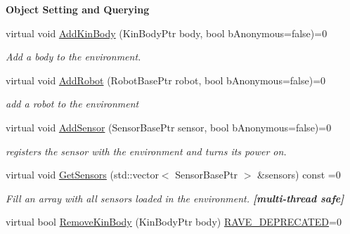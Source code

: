 \begin{Indent}{\bf Object Setting and Querying}\par
{\em \label{_amgrpaf76c21bb2575e8baa8ec7b09e379de9}
 \label{classOpenRAVE_1_1EnvironmentBase_env_objects}
\hypertarget{classOpenRAVE_1_1EnvironmentBase_env_objects}{}
 }\begin{DoxyCompactItemize}
\item 
virtual void \hyperlink{classOpenRAVE_1_1EnvironmentBase_a979950f27af5a2ce3d8b622cd98b33f5}{AddKinBody} (KinBodyPtr body, bool bAnonymous=false)=0
\begin{DoxyCompactList}\small\item\em Add a body to the environment. \item\end{DoxyCompactList}\item 
virtual void \hyperlink{classOpenRAVE_1_1EnvironmentBase_ae16bdfaaed85f17bffd696e17284d359}{AddRobot} (RobotBasePtr robot, bool bAnonymous=false)=0
\begin{DoxyCompactList}\small\item\em add a robot to the environment \item\end{DoxyCompactList}\item 
virtual void \hyperlink{classOpenRAVE_1_1EnvironmentBase_ad1160d65f608b83f8830010a93ae2991}{AddSensor} (SensorBasePtr sensor, bool bAnonymous=false)=0
\begin{DoxyCompactList}\small\item\em registers the sensor with the environment and turns its power on. \item\end{DoxyCompactList}\item 
virtual void \hyperlink{classOpenRAVE_1_1EnvironmentBase_aff29a5df3c89628089351e9cb68b474e}{GetSensors} (std::vector$<$ SensorBasePtr $>$ \&sensors) const =0
\begin{DoxyCompactList}\small\item\em Fill an array with all sensors loaded in the environment. {\bfseries \mbox{[}multi-\/thread safe\mbox{]}} \item\end{DoxyCompactList}\item 
virtual bool \hyperlink{classOpenRAVE_1_1EnvironmentBase_a00f7d94b59a27465a1153c064b25903e}{RemoveKinBody} (KinBodyPtr body) \hyperlink{classOpenRAVE_1_1EnvironmentBase_acb298cf75a95a9dcfdc2bfccd7321413}{RAVE\_\-DEPRECATED}=0
\item 

\end{DoxyCompactItemize}
\end{Indent}
